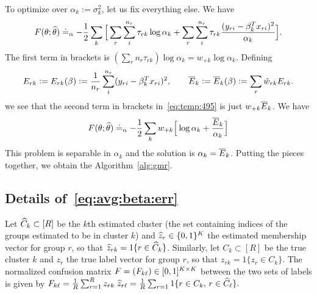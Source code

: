 \documentclass[12pt]{article}
\begin{document}
\begin{appendices}
	\medskip
	To optimize over $\alpha_k:=\sigma_k^2$, let us fix everything else. We have
	\begin{align}\label{eq:temp:495}
	    F(\theta;\widehat\theta) \doteq_{\alpha} -\frac12 \sum_k \Big[ \sum_r \sum_i^{n_r} \tau_{rk} \log \alpha_k + \sum_r \sum_i^{n_r} 
	    \tau_{rk}\frac{(y_{ri} - \beta_k^T x_{ri})^2}{\alpha_k}\Big].
	\end{align}
	The first term in brackets is 	 $(\sum_r n_r \tau_{rk}) \log \alpha_k = w_{+k} \log \alpha_k$. Defining
	\begin{align}
	    E_{rk} := E_{rk}(\beta) := \frac1{n_r}\sum_{i}^{n_r}   (y_{ri} - \beta_k^T x_{ri})^2, \qquad 
	    \overline{E}_k := \overline{E}_k(\beta) := \sum_r \check w_{rk} E_{rk}.
	\end{align}
	we see that the second term in brackets in~\eqref{eq:temp:495} is just $w_{+k}\overline{E}_k$. We have
	\begin{align}
	     F(\theta;\widehat\theta)   \doteq_{\alpha}
	     -\frac12 \sum_k w_{+k} \Big[  \log \alpha_k + \frac{\overline{E}_k}{\alpha_k}\Big]
	\end{align}
	This problem is separable in $\alpha_k$ and the solution is $\alpha_k = \overline{E}_k$. Putting the pieces together, we obtain the Algorithm~\ref{alg:gmr}.

\subsection{Details of~\eqref{eq:avg:beta:err}} \label{sec:avg:beta:derivation}
Let $\widehat C_k \subset [R]$ be the $k$th estimated cluster (the set containing  indices of the groups estimated to be in cluster $k$) and $\widehat z_{r} \in \{0,1\}^K$ the estimated membership vector for group $r$, so that $\widehat z_{rk} = 1\{r \in \widehat C_k\}$. Similarly, let $C_k \subset [R]$ be the true cluster $k$ and $z_{r}$ the true label vector for group $r$, so that $z_{rk} = 1\{z_r \in C_k\}$. The normalized confusion matrix $ F =(F_{k \ell})\in [0,1]^{K \times K}$  between the two sets of labels is given by
$
F_{k\ell} = \frac1R \sum_{r=1}^R z_{rk} \; \widehat z_{r\ell} = \frac1R \sum_{r=1} 1\{r \in C_k, \, r \in \widehat C_\ell \}.
$


\end{appendices}


\cleardoublepage

\small



\end{document}
